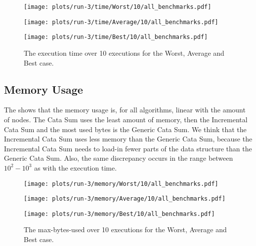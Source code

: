 \begin{figure}[H]
  \begin{minipage}{.5\textwidth}
    \centering
    \texttt{[image: plots/run-3/time/Worst/10/all\_benchmarks.pdf]}
  \end{minipage}
  \begin{minipage}{.5\textwidth}
    \centering
    \texttt{[image: plots/run-3/time/Average/10/all\_benchmarks.pdf]}  
  \end{minipage}
  \begin{center}
    \begin{minipage}[c]{.5\textwidth}
      \centering
      \texttt{[image: plots/run-3/time/Best/10/all\_benchmarks.pdf]}  
    \end{minipage}
  \end{center}
  \caption{The execution time over 10 executions for the Worst, Average and Best case.}
  \label{fig-exec-time-no-policy}
\end{figure}

\subsection{Memory Usage}
The  shows that the memory usage is, for all algorithms, linear with the amount of nodes. The Cata Sum uses the least amount of memory, then the Incremental Cata Sum and the most used bytes is the Generic Cata Sum. We think that the Incremental Cata Sum uses less memory than the Generic Cata Sum, because the Incremental Cata Sum needs to load-in fewer parts of the data structure than the Generic Cata Sum. Also, the same discrepancy occurs in the range between $10^2 - 10^3$ as with the execution time.

\begin{figure}[H]
  \begin{minipage}{.5\textwidth}
    \centering
    \texttt{[image: plots/run-3/memory/Worst/10/all\_benchmarks.pdf]}  
  \end{minipage}
  \begin{minipage}{.5\textwidth}
    \centering
    \texttt{[image: plots/run-3/memory/Average/10/all\_benchmarks.pdf]}  
  \end{minipage}
  \begin{center}
    \begin{minipage}[c]{.5\textwidth}
      \centering
      \texttt{[image: plots/run-3/memory/Best/10/all\_benchmarks.pdf]}  
    \end{minipage}
  \end{center}
  \caption{The max-bytes-used over 10 executions for the Worst, Average and Best case.}
  \label{fig-mem-usage-no-policy}
\end{figure}

